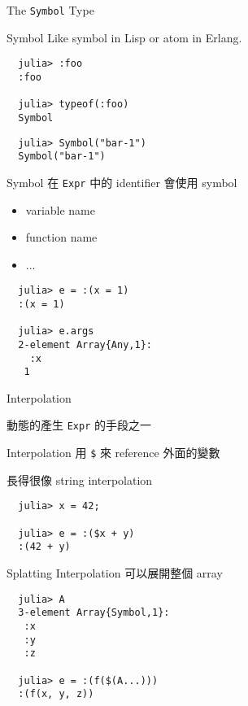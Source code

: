 \documentclass[14pt]{beamer}
\begin{document}
\begin{frame}[c]{}
  \centering
  \Large
  The \texttt{Symbol} Type
\end{frame}


\begin{frame}[fragile]{Symbol}
  Like symbol in Lisp or atom in Erlang.

\begin{lstlisting}
  julia> :foo
  :foo

  julia> typeof(:foo)
  Symbol
\end{lstlisting}

  \pause

\begin{lstlisting}
  julia> Symbol("bar-1")
  Symbol("bar-1")
\end{lstlisting}
\end{frame}


\begin{frame}[fragile]{Symbol}
  在 \texttt{Expr} 中的 identifier 會使用 symbol
  \begin{itemize}
    \item variable name
    \item function name
    \item ...
  \end{itemize}

  \pause
\begin{lstlisting}
  julia> e = :(x = 1)
  :(x = 1)

  julia> e.args
  2-element Array{Any,1}:
    :x
   1
\end{lstlisting}
\end{frame}


\begin{frame}[c]{}
  \centering
  \Large
  Interpolation

  \large
  動態的產生 \texttt{Expr} 的手段之一
\end{frame}


\begin{frame}[fragile]{Interpolation}
  用 \texttt{\$} 來 reference 外面的變數

  長得很像 string interpolation

\begin{lstlisting}
  julia> x = 42;

  julia> e = :($x + y)
  :(42 + y)
\end{lstlisting}
\end{frame}

\begin{frame}[fragile]{Splatting Interpolation}
  可以展開整個 array

\begin{lstlisting}
  julia> A
  3-element Array{Symbol,1}:
   :x
   :y
   :z

  julia> e = :(f($(A...)))
  :(f(x, y, z))
\end{lstlisting}
\end{frame}
\end{document}
